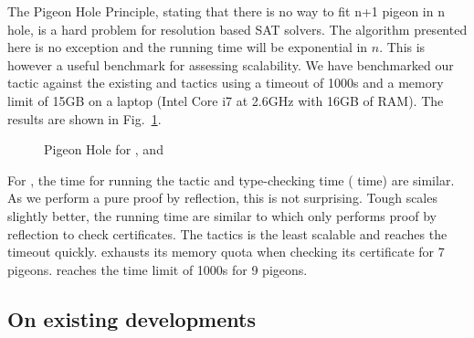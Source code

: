 \documentclass[utf8,a4paper,UKenglish,cleveref, autoref, thm-restate]{lipics-v2019}
\begin{document}
The Pigeon Hole Principle, stating that there is no way to fit n+1
pigeon in n hole, is a hard problem for resolution based SAT solvers.
%
The algorithm presented here is no exception and the running time will
be exponential in $n$. This is however a useful benchmark for
assessing scalability. We have benchmarked our  tactic
against the existing  and  tactics using a
timeout of 1000s and a memory limit of 15GB on a laptop (Intel Core i7
at 2.6GHz with 16GB of RAM).
%
The results are shown in Fig.~\ref{fig:pigeon}.
\begin{figure}
  \centering
  \qquad
  \caption{Pigeon Hole for ,  and }
  \label{fig:pigeon}
\end{figure}
For , the time for running the tactic and type-checking
time ( time) are similar.  As we perform a pure proof by
reflection, this is not surprising.  Tough  scales
slightly better, the running time are similar to  which
only performs proof by reflection to check certificates.
%
The tactics  is the least scalable and reaches the timeout quickly.
%
 exhausts its memory quota when checking its certificate for 7 pigeons.
 reaches the time limit of 1000s for 9 pigeons.

\subsection{On existing developments}
\end{document}
